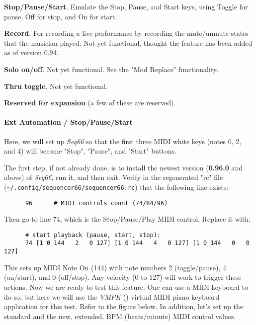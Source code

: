       \begin{enumber}
         \item \textbf{Stop/Pause/Start}.  Emulate the Stop, Pause, and
            Start keys, using Toggle for pause, Off for stop, and On for
            start.
         \item \textbf{Record}.  For recording a live performance by
            recording the mute/unmute states that the musician played.
            Not yet functional, thought the feature has been added as of
            version 0.94.
         \item \textbf{Solo on/off}.
            Not yet functional.  See the "Mod Replace" functionality.
         \item \textbf{Thru toggle}.
            Not yet functional.
         \item \textbf{Reserved for expansion} (a few of these are reserved).
      \end{enumber}

\paragraph{Ext Automation / Stop/Pause/Start}
\label{paragraph:seq66_rc_file_midi_ctrl_ex_stopps}

   Here, we will set up \textsl{Seq66} so that the first three MIDI
   white keys (notes 0, 2, and 4) will become "Stop", "Pause", and "Start"
   buttons.

   The first step, if not already done, is to install the newest version
   (\textbf{0.96.0} and above) of \textsl{Seq66},
   run it, and then exit.
   Verify in the regenerated "rc" file
   (\texttt{\textasciitilde/.config/sequencer66/sequencer66.rc}) that the
   following line exists:

   \begin{verbatim}
      96      # MIDI controls count (74/84/96)
   \end{verbatim}

   Then go to line 74, which is the Stop/Pause/Play MIDI control.
   Replace it with:

   \begin{verbatim}
      # start playback (pause, start, stop):
      74 [1 0 144   2   0 127] [1 0 144   4   0 127] [1 0 144   0   0 127]
   \end{verbatim}

   This sets up MIDI Note On (144) with note numbers 2 (toggle/pause),
   4 (on/start), and 0 (off/stop).
   Any velocity (0 to 127) will work to trigger these actions.
   Now we are ready to test this feature.  One can use a MIDI keyboard to do
   so, but here we will use the \textsl{VMPK} (\cite{vmpk}) virtual MIDI
   piano keyboard application for this test.  Refer to the figure below.
   In addition, let's set up the standard and the new, extended, BPM
   (beats/minute) MIDI control values.  

